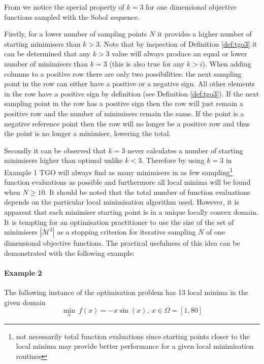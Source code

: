 From  we notice the special property of $k = 3$ for one dimensional objective functions sampled with the Sobol sequence. 

Firstly, for a lower number of sampling points $N$ it provides a higher number of starting minimisers than $k > 3$. Note that by inspection of Definition \ref{def:tgo3} it can be determined that any $k > 3$ value will always produce an equal or lower number of minimisers than $k = 3$ (this is also true for any $k > i$). When adding columns to a positive row there are only two possibilities: the next sampling point in the row can either have a positive or a negative sign. All other elements in the row have a positive sign by definition (see Definition \ref{def:tgo3}). If the next sampling point in the row has a positive sign then the row will just remain a positive row and the number of minimisers remain the same. If the point is a negative reference point then the row will no longer be a positive row and thus the point is no longer a minimiser, lowering the total.

Secondly it can be observed that $k = 3$ never calculates a number of starting minimisers higher than optimal unlike $k < 3$. Therefore by using $k = 3$ in Example 1 TGO will always find as many minimisers in as few sampling\footnote{not necessarily total function evaluations since starting points closer to the local minima may provide better performance for a given local minimisation routines} function evaluations as possible and furthermore all local minima will be found when $N \ge 10$. It should be noted that the total number of function evaluations depends on the particular local minimisation algorithm used. However, it is apparent that each minimiser starting point is in a unique locally convex domain. It is tempting for an optimisation practitioner to use the size of the set of minimisers $|\mathcal{M}^3|$ as a stopping criterion for iterative sampling $N$ of one dimensional objective functions. The practical usefulness of this idea can be demonstrated with the following example:

\paragraph{Example 2} The following instance of the optimisation problem has 13 local minima in the given domain
\begin{equation} \label{eq:test2}
\underset{x}{\min} ~f(x) = -x \sin(x), ~ x  \in  \Omega = [1, 80]
\end{equation}


